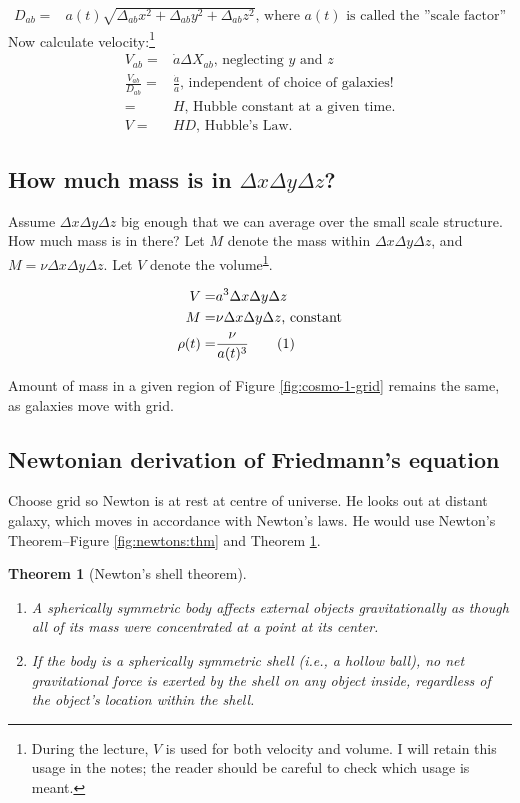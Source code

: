 \documentclass[]{article}
\newcommand\numberthis{\addtocounter{equation}{1}\tag{\theequation}}
\newtheorem{thm}{Theorem}
\begin{document}
 \begin{align*}            
 	D_{ab}=&a(t) \sqrt{\Delta_{ab} x^2 + \Delta_{ab} y^2 + \Delta_{ab} z^2}  \text{, where $a(t)$ is called the ''scale factor''}
\end{align*}
 Now calculate velocity:\footnote{\label{note1}During the lecture, $V$ is used for both velocity and volume. I will retain this usage in the notes; the reader should be careful to check which usage is meant.}           
 \begin{align*}	
 	V_{ab}=&\dot{a} \Delta X_{ab} \text{, neglecting $y$ and $z$}\\
 	\frac{V_{ab}}{D_{ab}} =& \frac{\dot{a}}{a} \text{, independent of choice of galaxies!}\\
 	=& H \text{, Hubble constant at a given time.}\\
 	V =& H D \text{, Hubble's Law.}
\end{align*}
 
\subsection{How much mass is in $\Delta x \Delta y \Delta z$?}

Assume  $\Delta x \Delta y \Delta z$ big enough that we can average over the small scale structure. How much mass is in there? Let $M$ denote the mass within $\Delta x \Delta y \Delta z$, and $M = \nu \Delta x \Delta y \Delta z$. Let $V$ denote the volume\textsuperscript{\ref{note1}}.

\begin{align*}
	V =& a^3 \Delta x \Delta y \Delta z\\
	M =& \nu \Delta x \Delta y \Delta z \text{, constant}\\
	\rho(t) =& \frac{\nu}{a(t)^3} \numberthis \label{eq:rho}
\end{align*}

Amount of mass in a given region of Figure \ref{fig:cosmo-1-grid} remains the same, as galaxies move with grid.

\subsection{Newtonian derivation of Friedmann's equation}
Choose grid so Newton is at rest at centre of universe. He looks out at distant galaxy, which moves in accordance with Newton's laws. He would use Newton's Theorem--Figure \ref{fig:newtons:thm} and Theorem \ref{thm:newton:shell}.

\begin{thm}[Newton's shell theorem]\label{thm:newton:shell}
	\begin{enumerate}
		\item A spherically symmetric body affects external objects gravitationally as though all of its mass were concentrated at a point at its center.
		\item If the body is a spherically symmetric shell (i.e., a hollow ball), no net gravitational force is exerted by the shell on any object inside, regardless of the object's location within the shell.
	\end{enumerate}
\end{thm}
\end{document}
